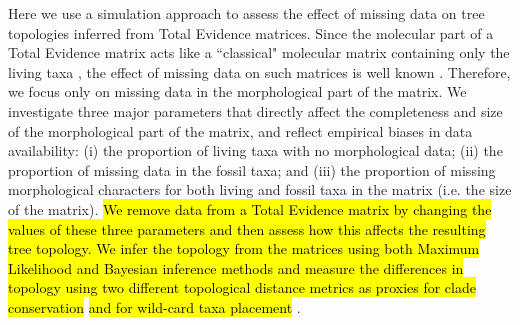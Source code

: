 \documentclass[12pt,letterpaper]{article}
\begin{document}
Here we use a simulation approach to assess the effect of missing data on tree topologies inferred from Total Evidence matrices.
Since the molecular part of a Total Evidence matrix acts like a ``classical" molecular matrix containing only the living taxa \citep{ronquista2012}, the effect of missing data on such matrices is well known \citep{wiensmissing2006,wiensmissing2008,lemmonthe2009,rouresite-specific2011}.
Therefore, we focus only on missing data in the morphological part of the matrix.
We investigate three major parameters that directly affect the completeness and size of the morphological part of the matrix, and reflect empirical biases in data availability: (i) the proportion of living taxa with no morphological data; (ii) the proportion of missing data in the fossil taxa; and (iii) the proportion of missing morphological characters for both living and fossil taxa in the matrix (i.e. the size of the matrix).
\hl{We remove data from a Total Evidence matrix by changing the values of these three parameters and then assess how this affects the resulting tree topology.
We infer the topology from the matrices using both Maximum Likelihood and Bayesian inference methods and measure the differences in topology using two different topological distance metrics as proxies for clade conservation } \citep[\hl{based on the Robinson-Foulds distance;}][]{RF1981}\hl{ and for wild-card taxa placement }\citep[\hl{based on the Triplets distance;}][]{critchlowthe1996}.


\end{document}
